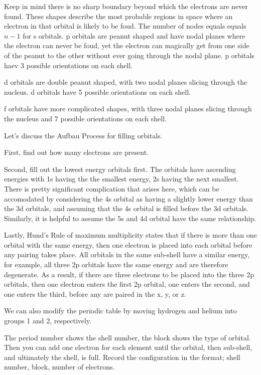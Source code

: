 \documentclass[../chem.tex]{subfiles}
\begin{document}
Keep in mind there is no sharp boundary beyond which the electrons are never found. These shapes describe the most probable regions in space where an electron in that orbital is likely to be foud.
The number of nodes equals equals $n-1$ for s orbitals. p orbitals are peanut shaped and have nodal planes where the electron can never be foud, yet the electron
can magically get from one side of the peanut to the other without ever going through the nodal plane. p orbitals haev 3 possible orientations on each shell.

d orbitals are double peanut shaped, with two nodal planes slicing through the nucleus. d orbitals have 5 possible orientations on each shell.

f orbitals have more complicated shapes, with three nodal planes slicing through the nucleus and 7 possible orientations on each shell.

Let's discuss the Aufbau Process for filling orbitals.

First, find out how many electrons are present. 

Second, fill out the lowest energy orbitals first. The orbitals have ascending energies with 1s having the the smallest energy, 2s having the next smallest.
There is pretty significant complication that arises here, which can be accomodated by considering the 4s orbital as having a slightly lower energy than the 3d orbitals, 
and assuming that the 4s orbital is filled before the 3d orbitals. Similarly, it is helpful to assume the 5s and 4d orbital have the same relationship.

Lastly, Hund's Rule of maximum multiplicity states that if there is more than one orbital with the same energy, then one electron is placed
into each orbital before any pairing takes place. All orbitals in the same sub-shell have a similar energy, for example, all three 2p orbitals have 
the same energy and are therefore degenerate. As a result, if there are three electrons to be placed into the three 2p orbitals, then one electron enters the first 2p orbital,
one enters the second, and one enters the third, before any are paired in the x, y, or z.

We can also modify the periodic table by moving hydrogen and helium into groups 1 and 2, respectively. 

The period number shows the shell number, the block shows the type of orbital. Then you can add one electron for each element until the orbital, then sub-shell, and ultimately the shell,  is full.
Record the configuration in the format;
shell number, block, number of electrons.
\end{document}
